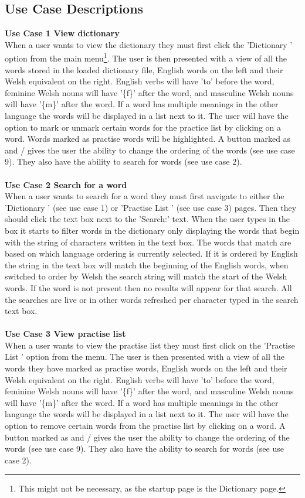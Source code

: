 \documentclass{project}
\newcommand*{\icon}[1]{%
  \raisebox{-.3\baselineskip}{%
    \texttt{[image: \#1]}%
  }%
}
\begin{document}
\subsection{Use Case Descriptions}
\textbf{Use Case 1 View dictionary}
\\
When a user wants to view the dictionary they must first click the 'Dictionary \icon{dictionary-icon}' option from the main menu\footnote{This might not be necessary, as the startup page is the Dictionary page.}. The user is then presented with a view of all the words stored in the loaded dictionary file, English words on the left and their Welsh equivalent on the right. English verbs will have 'to' before the word, feminine Welsh nouns will have '\{f\}' after the word, and masculine Welsh nouns will have '\{m\}' after the word. If a word has multiple meanings in the other language the words will be displayed in a list next to it. The user will have the option to mark or unmark certain words for the practice list by clicking on a word. Words marked as practise words will be highlighted. A button marked as \icon{order-icon} and \icon{AZ-icon}/\icon{ZA-icon} gives the user the ability to change the ordering of the words (see use case 9). They also have the ability to search for words (see use case 2).
\\\\
\textbf{Use Case 2 Search for a word}
\\
When a user wants to search for a word they must first navigate to either the 'Dictionary \icon{dictionary-icon}' (see use case 1) or 'Practise List \icon{practise-icon}' (see use case 3) pages. Then they should click the text box next to the 'Search:' text. When the user types in the box it starts to filter words in the dictionary only displaying the words that begin with the string of characters written in the text box. The words that match are based on which language ordering is currently selected. If it is ordered by English the string in the text box will match the beginning of the English words, when switched to order by Welsh the search string will match the start of the Welsh words. If the word is not present then no results will appear for that search. All the searches are live or in other words refreshed per character typed in the search text box.
\\\\
\textbf{Use Case 3 View practise list}
\\
When a user wants to view the practise list they must first click on the 'Practise List \icon{practise-icon}' option from the menu. The user is then presented with a view of all the words they have marked as practise words, English words on the left and their Welsh equivalent on the right. English verbs will have 'to' before the word, feminine Welsh nouns will have '\{f\}' after the word, and masculine Welsh nouns will have '\{m\}' after the word. If a word has multiple meanings in the other language the words will be displayed in a list next to it. The user will have the option to remove certain words from the practise list by clicking on a word. A button marked as \icon{order-icon} and \icon{AZ-icon}/\icon{ZA-icon} gives the user the ability to change the ordering of the words (see use case 9). They also have the ability to search for words (see use case 2).
\end{document}
